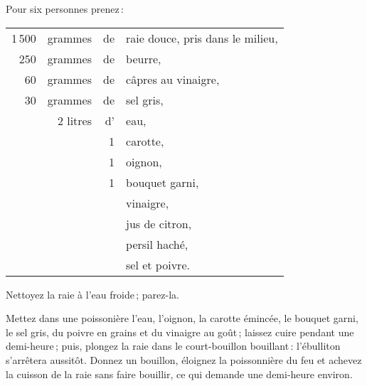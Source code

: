Pour six personnes prenez :

\medskip

\footnotesize
\begin{longtable}{rrrp{16em}}
  1 500 & grammes  & de & raie douce, pris dans le milieu,                                                \\
    250 & grammes  & de & beurre,                                                                         \\
     60 & grammes  & de & câpres au vinaigre,                                                             \\
     30 & grammes  & de & sel gris,                                                                       \\
        & 2 litres & d' & eau,                                                                            \\
        &          &  1 & carotte,                                                                        \\
        &          &  1 & oignon,                                                                         \\
        &          &  1 & bouquet garni,                                                                  \\
        &          &    & vinaigre,                                                                       \\
        &          &    & jus de citron,                                                                  \\
        &          &    & persil haché,                                                                   \\
        &          &    & sel et poivre.                                                                  \\
\end{longtable}
\normalsize

Nettoyez la raie à l'eau froide ; parez-la.

Mettez dans une poissonière l'eau, l'oignon, la carotte émincée, le bouquet
garni, le sel gris, du poivre en grains et du vinaigre au goût ; laissez cuire
pendant une demi-heure ; puis, plongez la raie dans le court-bouillon
bouillant : l'ébulliton s'arrêtera aussitôt. Donnez un bouillon, éloignez la
poissonnière du feu et achevez la cuisson de la raie sans faire bouillir, ce
qui demande une demi-heure environ.

